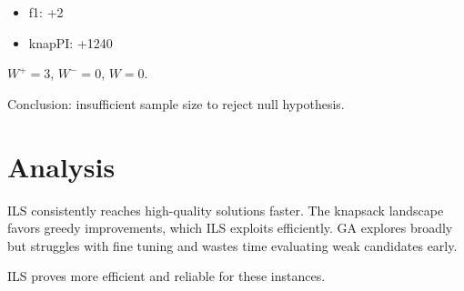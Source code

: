 \documentclass[12pt]{article}
\begin{document}
\begin{itemize}
\item f1: +2
\item knapPI: +1240
\end{itemize}

$W^+ = 3$, $W^- = 0$, $W = 0$.

Conclusion: insufficient sample size to reject null hypothesis.

\section{Analysis}

ILS consistently reaches high-quality solutions faster. The knapsack landscape favors greedy improvements, which ILS exploits efficiently. GA explores broadly but struggles with fine tuning and wastes time evaluating weak candidates early.

ILS proves more efficient and reliable for these instances.
\end{document}
